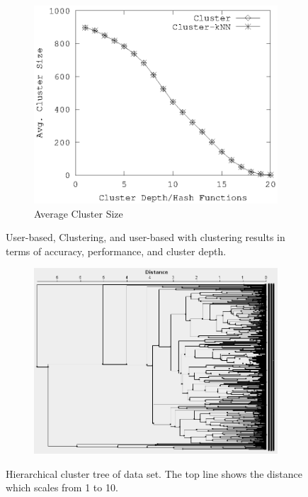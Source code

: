 \documentclass[conference]{IEEEtran}
\begin{document}
\begin{figure}[!h]
\begin{subfigure}[b]{0.225\textwidth}
        \end{subfigure} 
        \\
         \begin{subfigure}[b]{0.225\textwidth}
                \includegraphics[width=\textwidth]{charts/cl-size.eps}
                \caption{Average Cluster Size}
                \label{fig:cl-size}
        \end{subfigure} 
        \caption{User-based, Clustering, and user-based with clustering results in terms of accuracy, performance, and cluster depth.}
        \label{fig:custering}
\end{figure}

\begin{figure}[!h]
        \centering
        \begin{subfigure}[b]{0.50\textwidth}
        \includegraphics[width=\textwidth]{charts/cluster.png}
        \end{subfigure}
        \caption{Hierarchical cluster tree of data set. The top line shows the distance which scales from 1 to 10.}
        \label{fig:cluster}
\end{figure}
\end{document}
